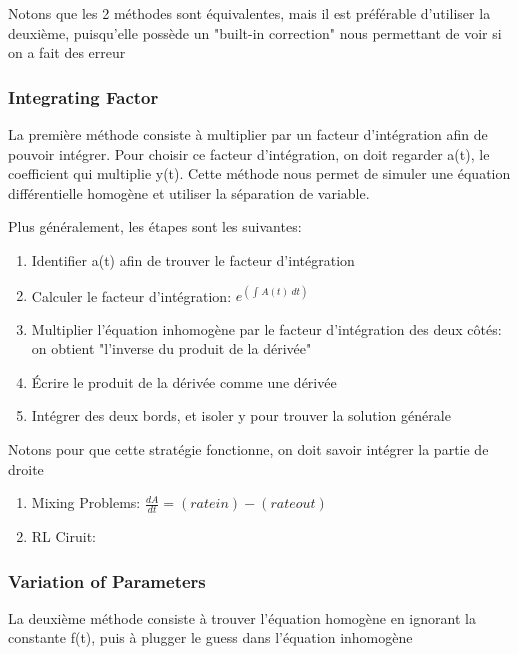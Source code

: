 \documentclass{article}
\begin{document}
Notons que les 2 méthodes sont équivalentes, mais il est préférable d'utiliser
la deuxième, puisqu'elle possède un "built-in correction" nous permettant de
voir si on a fait des erreur

\subsubsection{Integrating Factor}

La première méthode consiste à multiplier par un facteur d'intégration afin de
pouvoir intégrer. Pour choisir ce facteur d'intégration, on doit regarder a(t),
le coefficient qui multiplie y(t). Cette méthode nous permet de simuler
une équation différentielle homogène et utiliser la séparation de variable.

Plus généralement, les étapes sont les suivantes:
\begin{enumerate}
    \item Identifier a(t) afin de trouver le facteur d'intégration
    \item Calculer le facteur d'intégration: $ e^( \int_{{}}^{{}} {A(t)} \:
	d{t} {}) $
    \item Multiplier l'équation inhomogène par le facteur d'intégration des
	deux côtés: on obtient "l'inverse du produit de la dérivée"
    \item Écrire le produit de la dérivée comme une dérivée
    \item Intégrer des deux bords, et isoler y pour trouver la solution
	générale
\end{enumerate}

Notons pour que cette stratégie fonctionne, on doit savoir intégrer la partie
de droite

\begin{problem}
    \begin{enumerate}
	\item Mixing Problems: $ \frac{dA}{dt} = (rate in) - (rate out)$
	\item RL Ciruit:
    \end{enumerate}
\end{problem}

\subsubsection{Variation of Parameters}

La deuxième méthode consiste à trouver l'équation homogène en ignorant la
constante f(t), puis à plugger le guess dans l'équation inhomogène
\end{document}
